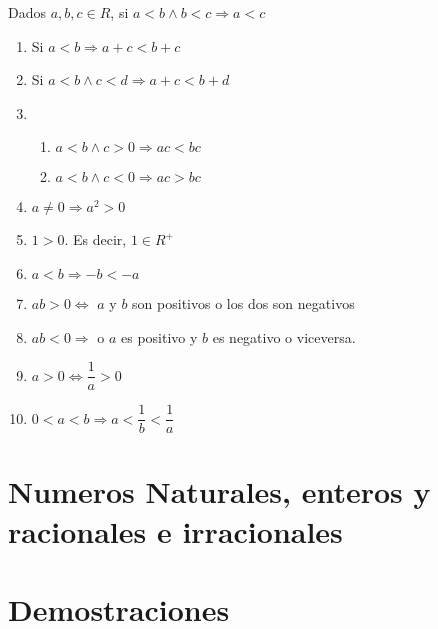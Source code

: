 \documentclass[10pt]{article}
\begin{document}
\newpage

\begin{theo}{}
Dados $a,b,c \in R$, si $a<b \land b<c \Rightarrow a<c$
\begin{multicols}{2}
\begin{enumerate}
\item Si $a<b \Rightarrow a+c < b+c$
\item Si $a<b \land c<d \Rightarrow a+c < b+d$
\item \begin{enumerate}
\item $a<b \land c>0 \Rightarrow ac < bc$
\item $a<b \land c<0 \Rightarrow ac > bc$
\end{enumerate}
\item $a \not = 0 \Rightarrow a^2 > 0$
\item $1 > 0$. Es decir, $1 \in R^+$
\item $a < b \Rightarrow -b < -a$
\item $ab > 0 \iff$ $a$ y $b$ son positivos o los dos son negativos
\item $ab < 0 \Rightarrow$ o $a$ es positivo y $b$ es negativo o viceversa.
\item $a>0 \iff \dfrac{1}{a} > 0$
\item $0<a<b \Rightarrow a<\dfrac{1}{b}<\dfrac{1}{a}$
\end{enumerate}
\end{multicols} 
\end{theo}

\section{Numeros Naturales, enteros y racionales e irracionales}



\newpage
\section{Demostraciones}
\end{document}
